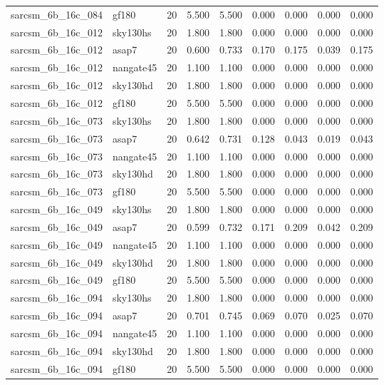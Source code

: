 \begin{tabular}{llrrrrrrr}
sarcsm\_6b\_16c\_084 & gf180 & 20 & 5.500 & 5.500 & 0.000 & 0.000 & 0.000 & 0.000 \\
sarcsm\_6b\_16c\_012 & sky130hs & 20 & 1.800 & 1.800 & 0.000 & 0.000 & 0.000 & 0.000 \\
sarcsm\_6b\_16c\_012 & asap7 & 20 & 0.600 & 0.733 & 0.170 & 0.175 & 0.039 & 0.175 \\
sarcsm\_6b\_16c\_012 & nangate45 & 20 & 1.100 & 1.100 & 0.000 & 0.000 & 0.000 & 0.000 \\
sarcsm\_6b\_16c\_012 & sky130hd & 20 & 1.800 & 1.800 & 0.000 & 0.000 & 0.000 & 0.000 \\
sarcsm\_6b\_16c\_012 & gf180 & 20 & 5.500 & 5.500 & 0.000 & 0.000 & 0.000 & 0.000 \\
sarcsm\_6b\_16c\_073 & sky130hs & 20 & 1.800 & 1.800 & 0.000 & 0.000 & 0.000 & 0.000 \\
sarcsm\_6b\_16c\_073 & asap7 & 20 & 0.642 & 0.731 & 0.128 & 0.043 & 0.019 & 0.043 \\
sarcsm\_6b\_16c\_073 & nangate45 & 20 & 1.100 & 1.100 & 0.000 & 0.000 & 0.000 & 0.000 \\
sarcsm\_6b\_16c\_073 & sky130hd & 20 & 1.800 & 1.800 & 0.000 & 0.000 & 0.000 & 0.000 \\
sarcsm\_6b\_16c\_073 & gf180 & 20 & 5.500 & 5.500 & 0.000 & 0.000 & 0.000 & 0.000 \\
sarcsm\_6b\_16c\_049 & sky130hs & 20 & 1.800 & 1.800 & 0.000 & 0.000 & 0.000 & 0.000 \\
sarcsm\_6b\_16c\_049 & asap7 & 20 & 0.599 & 0.732 & 0.171 & 0.209 & 0.042 & 0.209 \\
sarcsm\_6b\_16c\_049 & nangate45 & 20 & 1.100 & 1.100 & 0.000 & 0.000 & 0.000 & 0.000 \\
sarcsm\_6b\_16c\_049 & sky130hd & 20 & 1.800 & 1.800 & 0.000 & 0.000 & 0.000 & 0.000 \\
sarcsm\_6b\_16c\_049 & gf180 & 20 & 5.500 & 5.500 & 0.000 & 0.000 & 0.000 & 0.000 \\
sarcsm\_6b\_16c\_094 & sky130hs & 20 & 1.800 & 1.800 & 0.000 & 0.000 & 0.000 & 0.000 \\
sarcsm\_6b\_16c\_094 & asap7 & 20 & 0.701 & 0.745 & 0.069 & 0.070 & 0.025 & 0.070 \\
sarcsm\_6b\_16c\_094 & nangate45 & 20 & 1.100 & 1.100 & 0.000 & 0.000 & 0.000 & 0.000 \\
sarcsm\_6b\_16c\_094 & sky130hd & 20 & 1.800 & 1.800 & 0.000 & 0.000 & 0.000 & 0.000 \\
sarcsm\_6b\_16c\_094 & gf180 & 20 & 5.500 & 5.500 & 0.000 & 0.000 & 0.000 & 0.000 \\

\end{tabular}
